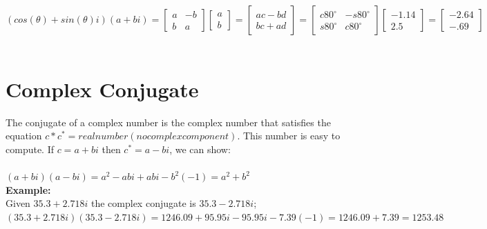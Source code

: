 \documentclass{article}
\begin{document}
$(cos(\theta) + sin(\theta)i)(a+bi)=\begin{bmatrix}
a & -b\\
b & a
\end{bmatrix}\begin{bmatrix}
a \\
b
\end{bmatrix}=\begin{bmatrix}
ac-bd \\
bc+ad
\end{bmatrix}=\begin{bmatrix}
c80^\circ & -s80^\circ\\
s80^\circ & c80^\circ
\end{bmatrix}\begin{bmatrix}
-1.14\\
2.5
\end{bmatrix}=\begin{bmatrix}
-2.64 \\
-.69
\end{bmatrix}$\\\\
\section{Complex Conjugate}
The conjugate of a complex number is the complex number that satisfies the equation $c*c^*=real number(no complex component)$. This number is easy to compute. If $c=a+bi$ then $c^*=a-bi$, we can show:\\\\
$(a+bi)(a-bi)=a^2-abi+abi-b^2(-1)=a^2+b^2$\\
\textbf{Example: }\\
Given $35.3+2.718i$ the complex conjugate is $35.3-2.718i$; $(35.3+2.718i)(35.3-2.718i)=1246.09+95.95i-95.95i-7.39(-1)=1246.09+7.39=1253.48$
\end{document}
